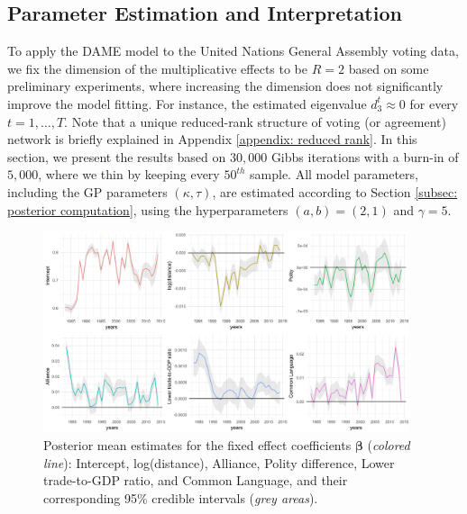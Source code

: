 \documentclass[a4paper]{article}
\begin{document}
\subsection{Parameter Estimation and Interpretation}\label{subsec: UNresult}
To apply the DAME model to the United Nations General Assembly voting data, we fix the dimension of the multiplicative effects to be $R=2$ based on some preliminary experiments, where increasing the dimension does not significantly improve the model fitting. For instance, the estimated eigenvalue $d^t_{3}\approx 0$ for every $t=1,\ldots,T$. Note that a unique reduced-rank structure of voting (or agreement) network is briefly explained in Appendix \ref{appendix: reduced rank}. In this section, we present the results based on $30,000$ Gibbs iterations with a burn-in of $5,000$, where we thin by keeping every $50^{th}$ sample. All model parameters, including the GP parameters $(\kappa, \tau)$, are estimated according to Section \ref{subsec: posterior computation}, using the hyperparameters $(a, b) = (2, 1)$ and $\gamma = 5$. \\ 
\begin{figure}[!b]
	\begin{center}
		\includegraphics[width=0.955\textwidth]{plots_paper/betaplot-1.png}
	\end{center}
	\caption {Posterior mean estimates for the fixed effect coefficients $\boldsymbol{\beta}$ (\textit{colored line}): Intercept, log(distance), Alliance, Polity difference, Lower trade-to-GDP ratio, and Common Language, and their corresponding 95\% credible intervals (\textit{grey areas}). }
	\label{figure:interceptplot}
\end{figure}
\end{document}
